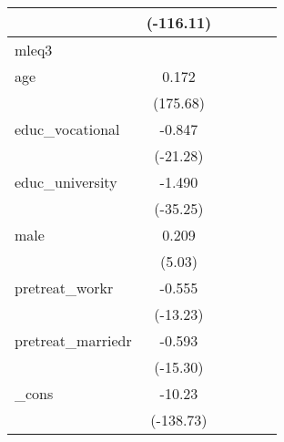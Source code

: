 {\begin{tabular}{l*{5}{c}}
            &   (-116.11)         &                     &                     &                     &                     \\
\hline
mleq3       &                     &                     &                     &                     &                     \\
age         &       0.172\sym{***}&                     &                     &                     &                     \\
            &    (175.68)         &                     &                     &                     &                     \\
[1em]
educ\_vocational&      -0.847\sym{***}&                     &                     &                     &                     \\
            &    (-21.28)         &                     &                     &                     &                     \\
[1em]
educ\_university&      -1.490\sym{***}&                     &                     &                     &                     \\
            &    (-35.25)         &                     &                     &                     &                     \\
[1em]
male        &       0.209\sym{***}&                     &                     &                     &                     \\
            &      (5.03)         &                     &                     &                     &                     \\
[1em]
pretreat\_workr&      -0.555\sym{***}&                     &                     &                     &                     \\
            &    (-13.23)         &                     &                     &                     &                     \\
[1em]
pretreat\_marriedr&      -0.593\sym{***}&                     &                     &                     &                     \\
            &    (-15.30)         &                     &                     &                     &                     \\
[1em]
\_cons      &      -10.23\sym{***}&                     &                     &                     &                     \\
            &   (-138.73)         &                     &                     &                     &                     \\

\end{tabular}}
